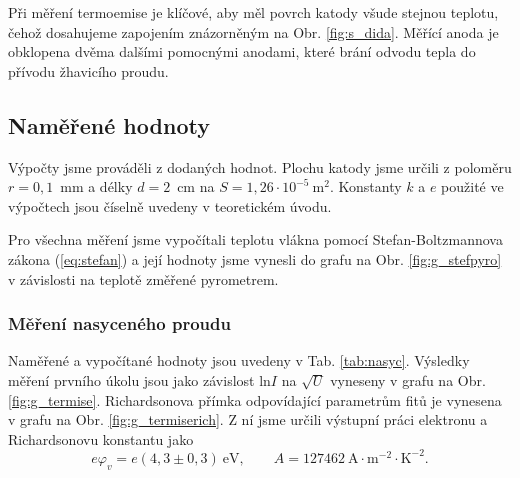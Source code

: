 \documentclass[english]{article}
\begin{document}
			
			Při měření termoemise je klíčové, aby měl povrch katody všude stejnou teplotu, čehož dosahujeme zapojením znázorněným na Obr. \ref{fig:s_dida}. Měřící anoda je obklopena dvěma dalšími pomocnými anodami, které brání odvodu tepla do přívodu žhavicího proudu.
							
\clearpage
	\subsection{Naměřené hodnoty}
		Výpočty jsme prováděli z dodaných hodnot. Plochu katody jsme určili z poloměru $r=0,1$~mm a délky $d=2$~cm na $S=1,26\cdot10^{-5}~\mathrm{m}^2$. Konstanty $k$ a $e$ použité ve výpočtech jsou číselně uvedeny v teoretickém úvodu.
		
		Pro všechna měření jsme vypočítali teplotu vlákna pomocí Stefan-Boltzmannova zákona (\ref{eq:stefan}) a její hodnoty jsme vynesli do grafu na Obr. \ref{fig:g_stefpyro} v závislosti na teplotě změřené pyrometrem.
		
		\subsubsection{Měření nasyceného proudu}
			Naměřené a vypočítané hodnoty jsou uvedeny v Tab. \ref{tab:nasyc}. Výsledky měření prvního úkolu jsou jako závislost ln$I$ na $\sqrt{U}$ vyneseny v grafu na Obr. \ref{fig:g_termise}. Richardsonova přímka odpovídající parametrům fitů je vynesena v grafu na Obr. \ref{fig:g_termiserich}. Z ní jsme určili výstupní práci elektronu a Richardsonovu konstantu jako
			\begin{equation}
				e\varphi_v = e(4,3\pm0,3)~\mathrm{eV}, \qquad A = 127462~\mathrm{A\cdot m^{-2}\cdot K^{-2}}.
			\end{equation} 
			
\end{document}
